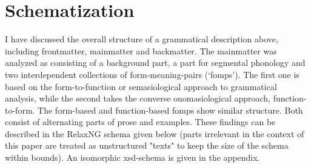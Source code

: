 \documentclass[a4paper,12pt]{article}
\begin{document}
\section{Schematization}
I have discussed the overall structure of a grammatical description above, including frontmatter, mainmatter and backmatter. The mainmatter was analyzed as consisting of a background part, a part for segmental phonology and two interdependent collections of form-meaning-pairs (`fomps'). The first one is based on the form-to-function or semasiological approach to grammatical analysis, while the second takes the converse onomasiological approach, function-to-form. The form-based and function-based fomps show similar structure. Both consist of alternating parts of prose and examples. These findings can be described in the RelaxNG schema given below (parts irrelevant in the context of this paper are treated as unstructured "texts" to keep the size of the schema within bounds). An isomorphic xsd-schema is given in the appendix.
\newpage
\footnotesize
\ea
\end{document}
